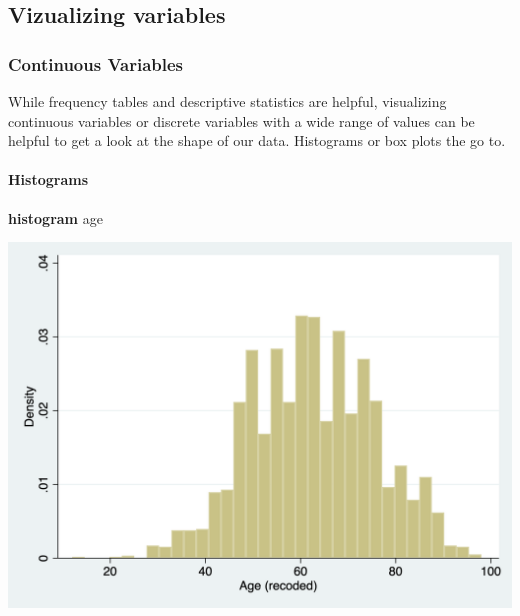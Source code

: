 \documentclass[
]{book}
\newenvironment{Shaded}{\begin{snugshade}}{\end{snugshade}}
\newcommand{\KeywordTok}[1]{\textcolor[rgb]{0.13,0.29,0.53}{\textbf{#1}}}
\newcommand{\NormalTok}[1]{#1}
\begin{document}
\hypertarget{vizualizing-variables}{%
\subsection*{Vizualizing variables}\label{vizualizing-variables}}

\hypertarget{continuous-variables}{%
\subsubsection*{Continuous Variables}\label{continuous-variables}}

While frequency tables and descriptive statistics are helpful, visualizing continuous variables or discrete variables with a wide range of values can be helpful to get a look at the shape of our data. Histograms or box plots the go to.

\hypertarget{histogram2}{%
\paragraph*{Histograms}\label{histogram2}}

\begin{Shaded}
\begin{Highlighting}[]
\KeywordTok{histogram}\NormalTok{ age }
\end{Highlighting}
\end{Shaded}

\includegraphics{images/histogram_stata.png}
\end{document}
